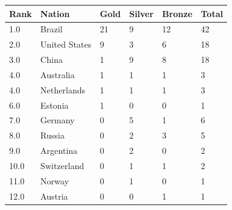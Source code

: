 \documentclass{article}
\begin{document}
\begin{tabular}{llllll}
\toprule
Rank & Nation & Gold & Silver & Bronze & Total \\
\midrule
1.0 & Brazil & 21 & 9 & 12 & 42 \\
2.0 & United States & 9 & 3 & 6 & 18 \\
3.0 & China & 1 & 9 & 8 & 18 \\
4.0 & Australia & 1 & 1 & 1 & 3 \\
4.0 & Netherlands & 1 & 1 & 1 & 3 \\
6.0 & Estonia & 1 & 0 & 0 & 1 \\
7.0 & Germany & 0 & 5 & 1 & 6 \\
8.0 & Russia & 0 & 2 & 3 & 5 \\
9.0 & Argentina & 0 & 2 & 0 & 2 \\
10.0 & Switzerland & 0 & 1 & 1 & 2 \\
11.0 & Norway & 0 & 1 & 0 & 1 \\
12.0 & Austria & 0 & 0 & 1 & 1 \\
\bottomrule
\end{tabular}
\end{document}
